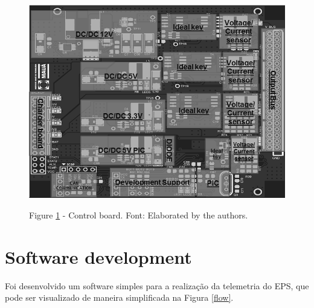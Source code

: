 \documentclass[final,3p,times,twocolumn,authoryear]{elsarticle}
\begin{document}
	\begin{figure}[th]
		\label{control}
		\centering
		\includegraphics[width=0.9\linewidth]{./figs/control}
			
		\begin{small}
		Figure \ref{control} - Control board. Font: Elaborated by the authors.
		\end{small}		
	\end{figure}

\section{Software development}
\label{Software development}

	Foi desenvolvido um software simples para a realização da telemetria do EPS, que pode ser visualizado de maneira simplificada na Figura \ref{flow}.
	
\end{document}
